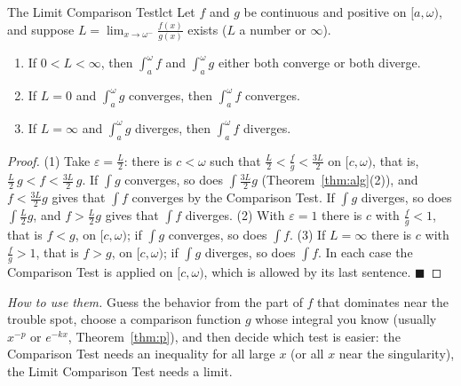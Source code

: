 \documentclass[11pt]{article}
\begin{document}
\begin{thm}{The Limit Comparison Test}{lct}
Let $f$ and $g$ be continuous and positive on $[a,\omega)$, and suppose $L=\displaystyle\lim_{x\to\omega^-}\frac{f(x)}{g(x)}$ exists ($L$ a number or $\infty$).
\begin{enumerate}[label=(\arabic*),leftmargin=*]
  \item If $0<L<\infty$, then $\int_a^\omega f$ and $\int_a^\omega g$ either both converge or both diverge.
  \item If $L=0$ and $\int_a^\omega g$ converges, then $\int_a^\omega f$ converges.
  \item If $L=\infty$ and $\int_a^\omega g$ diverges, then $\int_a^\omega f$ diverges.
\end{enumerate}
\end{thm}
\begin{proof}
(1) Take $\varepsilon=\frac L2$: there is $c<\omega$ such that $\frac L2<\frac fg<\frac{3L}2$ on $[c,\omega)$, that is, $\frac L2\,g<f<\frac{3L}2\,g$. If $\int g$ converges, so does $\int\frac{3L}2g$ (Theorem~\ref{thm:alg}(2)), and $f<\frac{3L}2g$ gives that $\int f$ converges by the Comparison Test. If $\int g$ diverges, so does $\int\frac L2g$, and $f>\frac L2g$ gives that $\int f$ diverges. (2) With $\varepsilon=1$ there is $c$ with $\frac fg<1$, that is $f<g$, on $[c,\omega)$; if $\int g$ converges, so does $\int f$. (3) If $L=\infty$ there is $c$ with $\frac fg>1$, that is $f>g$, on $[c,\omega)$; if $\int g$ diverges, so does $\int f$. In each case the Comparison Test is applied on $[c,\omega)$, which is allowed by its last sentence. $\blacksquare$
\end{proof}

\emph{How to use them.} Guess the behavior from the part of $f$ that dominates near the trouble spot, choose a comparison function $g$ whose integral you know (usually $x^{-p}$ or $e^{-kx}$, Theorem~\ref{thm:p}), and then decide which test is easier: the Comparison Test needs an inequality for all large $x$ (or all $x$ near the singularity), the Limit Comparison Test needs a limit.
\end{document}
